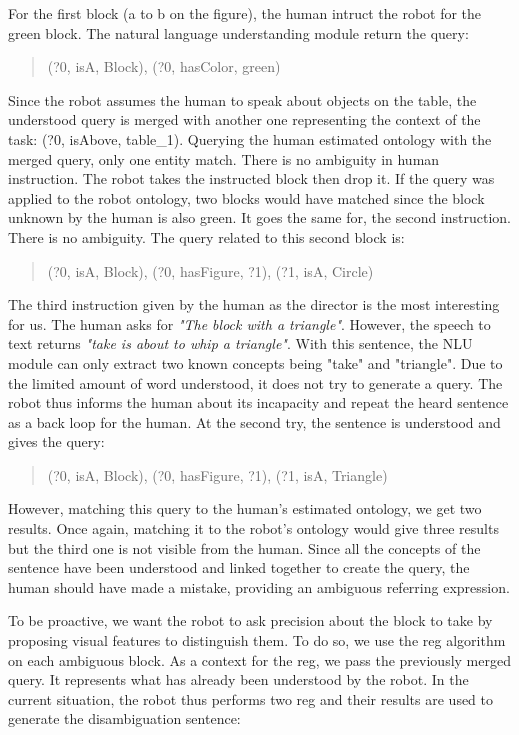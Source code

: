 For the first block (a to b on the figure), the human intruct the robot for the green block. The natural language understanding module return the \sparql{} query:

\begin{quote} 
\centering 
(?0, isA, Block), (?0, hasColor, green)
\end{quote}

Since the robot assumes the human to speak about objects on the table, the understood query is merged with another one representing the context of the task: (?0, isAbove, table\_1). Querying the human estimated ontology with the merged query, only one entity match. There is no ambiguity in human instruction. The robot takes the instructed block then drop it. If the query was applied to the robot ontology, two blocks would have matched since the block unknown by the human is also green. It goes the same for, the second instruction. There is no ambiguity. The \sparql{} query related to this second block is:

\begin{quote} 
\centering 
(?0, isA, Block), (?0, hasFigure, ?1), (?1, isA, Circle)
\end{quote}

The third instruction given by the human as the director is the most interesting for us. The human asks for \textit{"The block with a triangle"}. However, the speech to text returns \textit{"take is about to whip a triangle"}. With this sentence, the NLU module can only extract two known concepts being "take" and "triangle". Due to the limited amount of word understood, it does not try to generate a \sparql{} query. The robot thus informs the human about its incapacity and repeat the heard sentence as a back loop for the human. At the second try, the sentence is understood and gives the query:

\begin{quote} 
\centering 
(?0, isA, Block), (?0, hasFigure, ?1), (?1, isA, Triangle)
\end{quote}

However, matching this query to the human's estimated ontology, we get two results. Once again, matching it to the robot's ontology would give three results but the third one is not visible from the human. Since all the concepts of the sentence have been understood and linked together to create the query, the human should have made a mistake, providing an ambiguous referring expression.

To be proactive, we want the robot to ask precision about the block to take by proposing visual features to distinguish them. To do so, we use the \acrshort{reg} algorithm on each ambiguous block. As a context for the \acrshort{reg}, we pass the previously merged \sparql{} query. It represents what has already been understood by the robot. In the current situation, the robot thus performs two \acrshort{reg} and their results are used to generate the disambiguation sentence:

